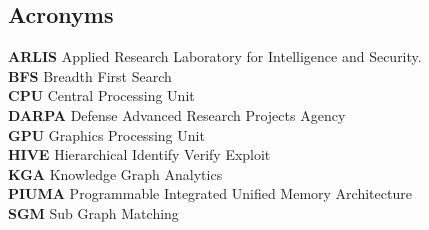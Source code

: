 \documentclass[letterpaper, 10pt]{article}
\begin{document}
\begin{multicols}{2}
    \section{Acronyms}
        \small{
        \textbf{ARLIS} Applied Research Laboratory for Intelligence and Security.\\ 
        \textbf{BFS} Breadth First Search \\
        \textbf{CPU} Central Processing Unit \\
        \textbf{DARPA} Defense Advanced Research Projects Agency \\ 
        \textbf{GPU} Graphics Processing Unit \\
        \textbf{HIVE} Hierarchical Identify Verify Exploit \\
        \textbf{KGA} Knowledge Graph Analytics \\
        \textbf{PIUMA} Programmable Integrated Unified Memory Architecture \\ 
        \textbf{SGM} Sub Graph Matching \\
        }
    \end{multicols}
    \newpage
\end{document}
